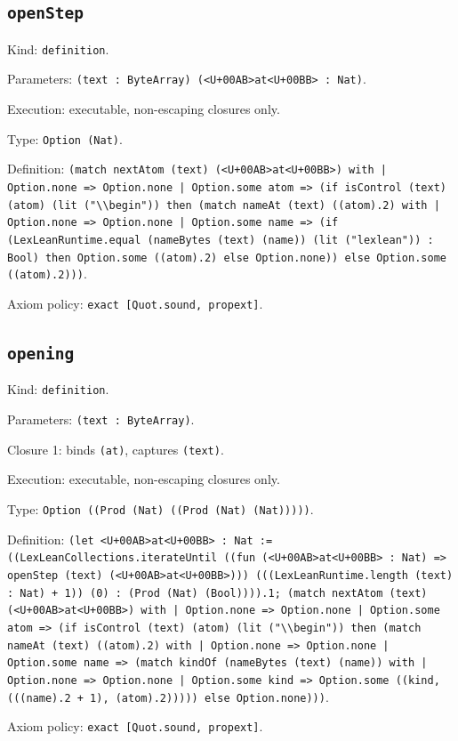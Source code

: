 \documentclass[11pt]{article}
\begin{document}
\subsection*{\texttt{openStep}}
\noindent Kind: \texttt{definition}.\par
\noindent Parameters: \texttt{(text : ByteArray) (<U+00AB>at<U+00BB> : Nat)}.\par
\noindent Execution: executable, non-escaping closures only.\par
\noindent Type: \texttt{Option (Nat)}.\par
\noindent Definition: \texttt{(match nextAtom (text) (<U+00AB>at<U+00BB>) with | Option.none => Option.none | Option.some atom => (if isControl (text) (atom) (lit ("\textbackslash{}\textbackslash{}begin")) then (match nameAt (text) ((atom).2) with | Option.none => Option.none | Option.some name => (if (LexLeanRuntime.equal (nameBytes (text) (name)) (lit ("lexlean")) : Bool) then Option.some ((atom).2) else Option.none)) else Option.some ((atom).2)))}.\par
\noindent Axiom policy: \texttt{exact [Quot.sound, propext]}.\par
\subsection*{\texttt{opening}}
\noindent Kind: \texttt{definition}.\par
\noindent Parameters: \texttt{(text : ByteArray)}.\par
\noindent Closure 1: binds \texttt{(at)}, captures \texttt{(text)}.\par
\noindent Execution: executable, non-escaping closures only.\par
\noindent Type: \texttt{Option ((Prod (Nat) ((Prod (Nat) (Nat)))))}.\par
\noindent Definition: \texttt{(let <U+00AB>at<U+00BB> : Nat := ((LexLeanCollections.iterateUntil ((fun (<U+00AB>at<U+00BB> : Nat) => openStep (text) (<U+00AB>at<U+00BB>))) (((LexLeanRuntime.length (text) : Nat) + 1)) (0) : (Prod (Nat) (Bool)))).1; (match nextAtom (text) (<U+00AB>at<U+00BB>) with | Option.none => Option.none | Option.some atom => (if isControl (text) (atom) (lit ("\textbackslash{}\textbackslash{}begin")) then (match nameAt (text) ((atom).2) with | Option.none => Option.none | Option.some name => (match kindOf (nameBytes (text) (name)) with | Option.none => Option.none | Option.some kind => Option.some ((kind, (((name).2 + 1), (atom).2))))) else Option.none)))}.\par
\noindent Axiom policy: \texttt{exact [Quot.sound, propext]}.\par
\end{document}
